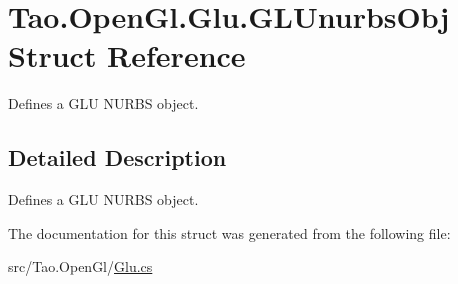 \hypertarget{struct_tao_1_1_open_gl_1_1_glu_1_1_g_l_unurbs_obj}{
\section{Tao.OpenGl.Glu.GLUnurbsObj Struct Reference}
\label{struct_tao_1_1_open_gl_1_1_glu_1_1_g_l_unurbs_obj}
}


Defines a GLU NURBS object.  




\subsection{Detailed Description}
Defines a GLU NURBS object. 

The documentation for this struct was generated from the following file:\begin{DoxyCompactItemize}
\item 
src/Tao.OpenGl/\hyperlink{_glu_8cs}{Glu.cs}\end{DoxyCompactItemize}

